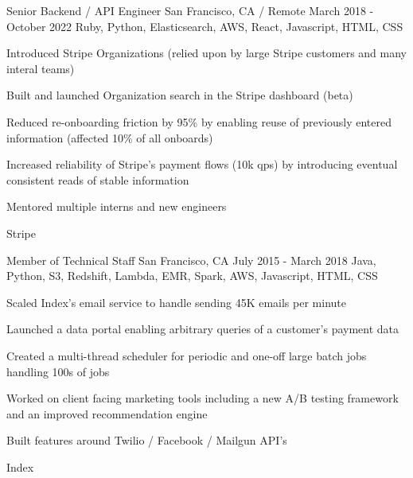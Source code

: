\documentclass[letterpaper]{simjega-resume}
\begin{document}
{Senior Backend / API Engineer}
{San Francisco, CA / Remote}
{March 2018 - October 2022}
{Ruby, Python, Elasticsearch, AWS, React, Javascript, HTML, CSS}
{\begin{tightitemize}
\item[] Introduced Stripe Organizations (relied upon by large Stripe customers and many interal teams)
\item[] Built and launched Organization search in the Stripe dashboard (beta)
\item[] Reduced re-onboarding friction by 95\% by enabling reuse of previously entered information (affected 10\% of all onboards)
\item[] Increased reliability of Stripe's payment flows (10k qps) by introducing eventual consistent reads of stable information
\item[] Mentored multiple interns and new engineers
\end{tightitemize}}
{Stripe}

{Member of Technical Staff}
{San Francisco, CA}
{July 2015 - March 2018}
{Java, Python, S3, Redshift, Lambda, EMR, Spark, AWS, Javascript, HTML, CSS}
{\begin{tightitemize}
\item[] Scaled Index's email service to handle sending 45K emails per minute
\item[] Launched a data portal enabling arbitrary queries of a customer's payment data
\item[] Created a multi-thread scheduler for periodic and one-off large batch jobs handling 100s of jobs
\item[] Worked on client facing marketing tools including a new A/B testing framework and an improved recommendation engine
\item[] Built features around Twilio / Facebook / Mailgun API's
\end{tightitemize}}
{Index}
\end{document}
